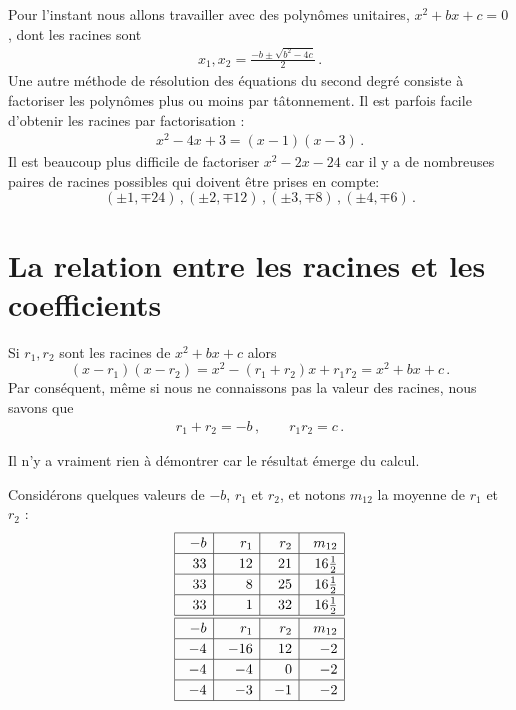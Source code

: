 Pour l'instant nous allons travailler avec des polynômes unitaires, $x^2+bx+c=0$, dont les racines sont 
\begin{align}
x_1, x_2 = \frac{-b\pm\sqrt{b^2-4c}}{2}\,.\label{eq.quadratic-roots}
\end{align}
Une autre méthode de résolution des équations du second degré consiste à factoriser les polynômes plus ou moins par tâtonnement. Il est parfois facile d'obtenir les racines par factorisation :
\begin{align}
x^2-4x+3= (x-1)(x-3)\label{eq.quadratic-lill}\,.
\end{align}
Il est beaucoup plus difficile de factoriser $x^2-2x-24$ car il y a de nombreuses paires de racines possibles qui doivent être prises en compte:
\[
(\pm 1,\mp 24)\,, (\pm 2,\mp 12)\,, (\pm 3,\mp 8)\,, (\pm 4,\mp 6)\,.
\]

\section{La relation entre les racines et les coefficients}\label{s.computing}

\begin{theorem}\label{thm.roots-coefficients}
Si $r_1,r_2$ sont les racines de $x^2+bx+c$ alors 
\[
(x-r_1)(x-r_2)=x^2 - (r_1+r_2)x + r_1r_2=x^2+bx+c\,.
\]
Par conséquent, même si nous ne connaissons pas la valeur des racines, nous savons que
\begin{align}\label{eq.viete-quad}
r_1+r_2 = -b\,,\quad\quad r_1r_2=c\,.
\end{align}
\end{theorem}

Il n'y a vraiment rien à démontrer car le résultat émerge du calcul.

Considérons quelques valeurs de $-b$, $r_1$ et $r_2$, et notons  $m_{12}$  la moyenne de $r_1$ et $r_2$ :
\[
\renewcommand{\arraystretch}{1.2}
\begin{array}{|@{\hspace{1em}}r|@{\hspace{1em}}r|@{\hspace{1em}}r|@{\hspace{1em}}r|}
\hline
-b& r_1 & r_2 &m_{12}\\\hline
33 & 12 & 21 & 16\frac{1}{2}\\\hline
33 & 8 & 25 & 16\frac{1}{2}\\\hline
33 & 1 & 32 & 16\frac{1}{2}\\\hline\hline
-b& r_1 & r_2 &m_{12}\\\hline
-4 & -16 & 12 & -2 \\\hline
-4 & -4 & 0 & -2 \\\hline
-4 & -3 & -1 & -2 \\\hline
\end{array}
\]


